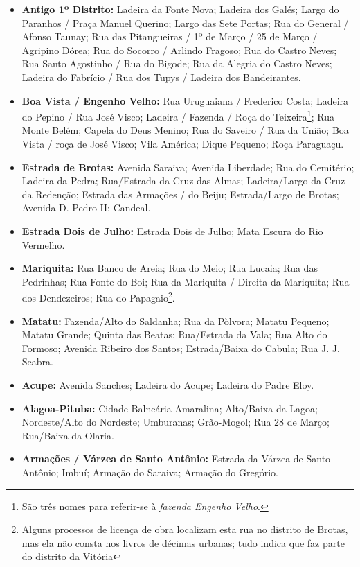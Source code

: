 \begin{itemize}
\item \textbf{Antigo 1º Distrito:} Ladeira da Fonte Nova; Ladeira dos Galés; Largo do Paranhos / Praça Manuel Querino; Largo das Sete Portas; Rua do General / Afonso Taunay; Rua das Pitangueiras / 1º de Março / 25 de Março / Agripino Dórea;  Rua do Socorro / Arlindo Fragoso; Rua do Castro Neves; Rua Santo Agostinho / Rua do Bigode; Rua da Alegria do Castro Neves; Ladeira do Fabrício / Rua dos Tupys / Ladeira dos Bandeirantes.
\item \textbf{Boa Vista / Engenho Velho:} Rua Uruguaiana / Frederico Costa; Ladeira do Pepino / Rua José Visco; Ladeira / Fazenda / Roça do Teixeira\footnote{São três nomes para referir-se à \textit{fazenda Engenho Velho}.}; Rua Monte Belém; Capela do Deus Menino; Rua do Saveiro / Rua da União; Boa Vista / roça de José Visco; Vila América; Dique Pequeno; Roça Paraguaçu.
\item \textbf{Estrada de Brotas:} Avenida Saraiva; Avenida Liberdade; Rua do Cemitério; Ladeira da Pedra; Rua/Estrada da Cruz das Almas; Ladeira/Largo da Cruz da Redenção; Estrada das Armações / do Beiju; Estrada/Largo de Brotas; Avenida D. Pedro II; Candeal.
\item \textbf{Estrada Dois de Julho:} Estrada Dois de Julho; Mata Escura do Rio Vermelho.
\item \textbf{Mariquita:} Rua Banco de Areia; Rua do Meio; Rua Lucaia; Rua das Pedrinhas; Rua Fonte do Boi; Rua da Mariquita / Direita da Mariquita; Rua dos Dendezeiros; Rua do Papagaio\footnote{Alguns processos de licença de obra localizam esta rua no distrito de Brotas, mas ela não consta nos livros de décimas urbanas; tudo indica que faz parte do distrito da Vitória}.
\item \textbf{Matatu:} Fazenda/Alto do Saldanha; Rua da Pòlvora; Matatu Pequeno; Matatu Grande; Quinta das Beatas; Rua/Estrada da Vala; Rua Alto do Formoso; Avenida Ribeiro dos Santos; Estrada/Baixa do Cabula; Rua J. J. Seabra.
\item \textbf{Acupe:} Avenida Sanches; Ladeira do Acupe; Ladeira do Padre Eloy.
\item \textbf{Alagoa-Pituba:} Cidade Balneária Amaralina; Alto/Baixa da Lagoa; Nordeste/Alto do Nordeste; Umburanas; Grão-Mogol; Rua 28 de Março; Rua/Baixa da Olaria.
\item \textbf{Armações / Várzea de Santo Antônio:} Estrada da Várzea de Santo Antônio; Imbuí; Armação do Saraiva; Armação do Gregório.
\end{itemize}

